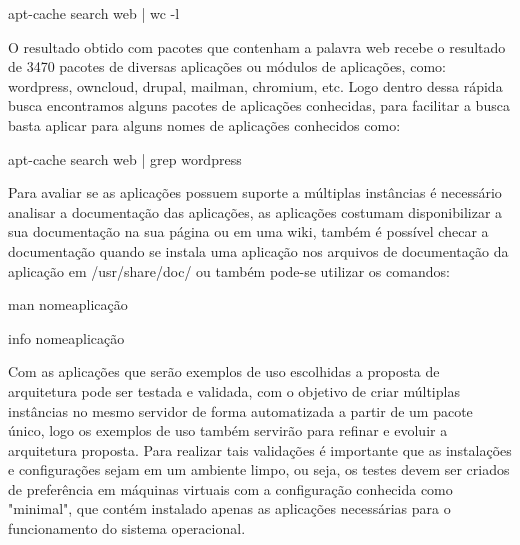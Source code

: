\begin{center}
apt-cache search web | wc -l
\end{center}

O resultado obtido com pacotes que contenham a palavra web recebe o resultado de 3470
pacotes de diversas aplicações ou módulos de aplicações, como:
wordpress, owncloud, drupal, mailman, chromium, etc. Logo dentro dessa rápida busca
encontramos alguns pacotes de aplicações conhecidas, para facilitar a busca basta
aplicar para alguns nomes de aplicações conhecidos como:

\begin{center}
apt-cache search web | grep wordpress
\end{center}

Para avaliar se as aplicações possuem suporte a múltiplas instâncias é necessário
analisar a documentação das aplicações, as aplicações costumam disponibilizar a sua
documentação na sua página ou em uma wiki, também é possível checar a documentação
quando se instala uma aplicação nos arquivos de documentação da aplicação em
/usr/share/doc/ ou também pode-se utilizar os comandos:

\begin{center}
man nomeaplicação

info nomeaplicação
\end{center}

Com as aplicações que serão exemplos de uso escolhidas a proposta de arquitetura
pode ser testada e validada, com o objetivo de criar múltiplas instâncias
no mesmo servidor de forma automatizada a partir de um pacote único, logo os
exemplos de uso também servirão para refinar e evoluir a arquitetura proposta.
Para realizar tais validações é importante que as instalações e configurações
sejam em um ambiente limpo, ou seja, os testes devem ser criados de preferência
em máquinas virtuais com a configuração conhecida como "minimal", que contém
instalado apenas as aplicações necessárias para o funcionamento do sistema operacional.
